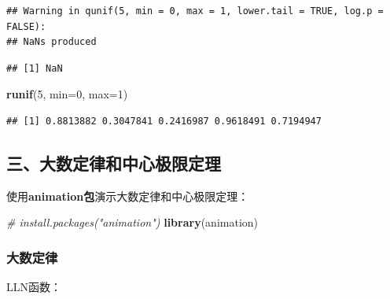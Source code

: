 \documentclass[]{article}
\newenvironment{Shaded}{\begin{snugshade}}{\end{snugshade}}
\newcommand{\KeywordTok}[1]{\textcolor[rgb]{0.13,0.29,0.53}{\textbf{{#1}}}}
\newcommand{\DataTypeTok}[1]{\textcolor[rgb]{0.13,0.29,0.53}{{#1}}}
\newcommand{\DecValTok}[1]{\textcolor[rgb]{0.00,0.00,0.81}{{#1}}}
\newcommand{\CommentTok}[1]{\textcolor[rgb]{0.56,0.35,0.01}{\textit{{#1}}}}
\newcommand{\NormalTok}[1]{{#1}}
\begin{document}
\begin{verbatim}
## Warning in qunif(5, min = 0, max = 1, lower.tail = TRUE, log.p = FALSE):
## NaNs produced
\end{verbatim}

\begin{verbatim}
## [1] NaN
\end{verbatim}

\begin{Shaded}
\begin{Highlighting}[]
\KeywordTok{runif}\NormalTok{(}\DecValTok{5}\NormalTok{, }\DataTypeTok{min=}\DecValTok{0}\NormalTok{, }\DataTypeTok{max=}\DecValTok{1}\NormalTok{)}
\end{Highlighting}
\end{Shaded}

\begin{verbatim}
## [1] 0.8813882 0.3047841 0.2416987 0.9618491 0.7194947
\end{verbatim}

\subsection{三、大数定律和中心极限定理}

使用\textbf{animation包}演示大数定律和中心极限定理：

\begin{Shaded}
\begin{Highlighting}[]
\CommentTok{# install.packages("animation")}
\KeywordTok{library}\NormalTok{(animation)}
\end{Highlighting}
\end{Shaded}

\subsubsection{大数定律}

LLN函数：
\end{document}
